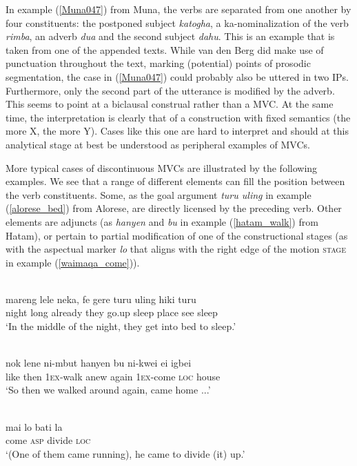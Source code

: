 In example (\ref{Muna047}) from Muna, the verbs are separated from one another by four constituents: the postponed subject \textit{katogha}, a ka-nominalization of the verb \textit{rimba}, an adverb \textit{dua} and the second subject \textit{dahu}. This is an example that is taken from one of the appended texts. While van den Berg did make use of punctuation throughout the text, marking (potential) points of prosodic segmentation, the case in (\ref{Muna047}) could probably also be uttered in two IPs. Furthermore, only the second part of the utterance is modified by the adverb. This seems to point at a biclausal construal rather than a MVC. At the same time, the interpretation is clearly that of a construction with fixed semantics (the more X, the more Y). Cases like this one are hard to interpret and should at this analytical stage at best be understood as peripheral examples of MVCs.

More typical cases of discontinuous MVCs are illustrated by the following examples. We see that a range of different elements can fill the position between the verb constituents. Some, as the goal argument \textit{turu uling} in example (\ref{alorese_bed}) from Alorese, are directly licensed by the preceding verb. Other elements are adjuncts (as \textit{hanyen} and \textit{bu} in example (\ref{hatam_walk}) from Hatam), or pertain to partial modification of one of the constructional stages (as with the aspectual marker \textit{lo} that aligns with the right edge of the motion \textsc{stage} in example (\ref{waimaqa_come})).

\ea \label{alorese_bed}
\\
\gll mareng lele neka, fe gere turu uling hiki turu \\
night long already they go.up sleep place see sleep \\
\glft `In the middle of the night, they get into bed to sleep.'\\ 
\z

\ea \label{hatam_walk}
\\
\gll nok lene ni-mbut hanyen bu ni-kwei ei igbei \\
like then 1\textsc{ex}-walk anew again 1\textsc{ex}-come \textsc{loc} house \\
\glft `So then we walked around again, came home ...'\\ 
\z

\ea \label{waimaqa_come}
\\
\gll mai lo bati la \\
come \textsc{asp} divide \textsc{loc} \\
\glft `(One of them came running), he came to divide (it) up.'\\ 
\z

